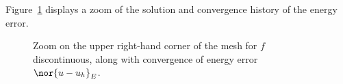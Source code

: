 Figure~\ref{fig:discForcing2} displays a zoom of the solution and convergence history of the energy error.
\begin{figure}[!h]
\centering
{}
\caption{Zoom on the upper right-hand corner of the mesh for $f$ discontinuous, along with convergence of energy error $\nor{u-u_h}_E$.}
\label{fig:discForcing2}
\end{figure}

